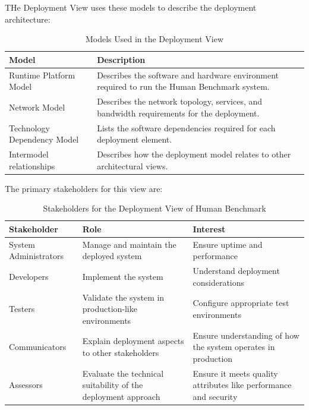 THe Deployment View uses these models to describe the deployment architecture:
\begin{table}[H]
    \centering
    \begin{tabular}{|p{}|p{}|}
        \hline
        \textbf{Model}              & \textbf{Description}                                                                        \\
        \hline
        Runtime Platform Model      & Describes the software and hardware environment required to run the Human Benchmark system. \\
        \hline
        Network Model               & Describes the network topology, services, and bandwidth requirements for the deployment.    \\
        \hline
        Technology Dependency Model & Lists the software dependencies required for each deployment element.                       \\
        \hline
        Intermodel relationships    & Describes how the deployment model relates to other architectural views.                    \\
        \hline
    \end{tabular}
    \caption{Models Used in the Deployment View}
    \label{tab:deployment_view_models}
\end{table}

The primary stakeholders for this view are:
\begin{table}[H]
    \centering
    \begin{tabular}{|p{}|p{}|p{}|}
        \hline
        \textbf{Stakeholder}  & \textbf{Role}                                                 & \textbf{Interest}                                                \\
        \hline
        System Administrators & Manage and maintain the deployed system                       & Ensure uptime and performance                                    \\
        \hline
        Developers            & Implement the system                                          & Understand deployment considerations                             \\
        \hline
        Testers               & Validate the system in production-like environments           & Configure appropriate test environments                          \\
        \hline
        Communicators         & Explain deployment aspects to other stakeholders              & Ensure understanding of how the system operates in production    \\
        \hline
        Assessors             & Evaluate the technical suitability of the deployment approach & Ensure it meets quality attributes like performance and security \\
        \hline
    \end{tabular}
    \caption{Stakeholders for the Deployment View of Human Benchmark}
    \label{tab:deployment_view_stakeholders}
\end{table}

